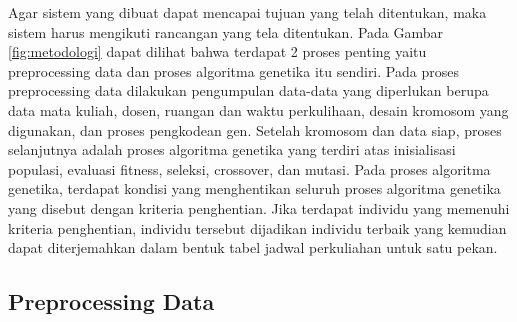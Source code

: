 Agar sistem yang dibuat dapat mencapai tujuan yang telah ditentukan, maka sistem harus mengikuti rancangan yang tela ditentukan.
Pada Gambar \ref{fig:metodologi} dapat dilihat bahwa terdapat 2 proses penting yaitu preprocessing data dan proses algoritma genetika itu sendiri.
Pada proses preprocessing data dilakukan pengumpulan data-data yang diperlukan berupa data mata kuliah, dosen, ruangan dan waktu perkulihaan, desain kromosom yang digunakan, dan proses pengkodean gen.
Setelah kromosom dan data siap, proses selanjutnya adalah proses algoritma genetika yang terdiri atas inisialisasi populasi, evaluasi fitness, seleksi, crossover, dan mutasi.
Pada proses algoritma genetika, terdapat kondisi yang menghentikan seluruh proses algoritma genetika yang disebut dengan kriteria penghentian.
Jika terdapat individu yang memenuhi kriteria penghentian, individu tersebut dijadikan individu terbaik yang kemudian dapat diterjemahkan dalam bentuk tabel jadwal perkuliahan untuk satu pekan.

\subsection{Preprocessing Data}
  
